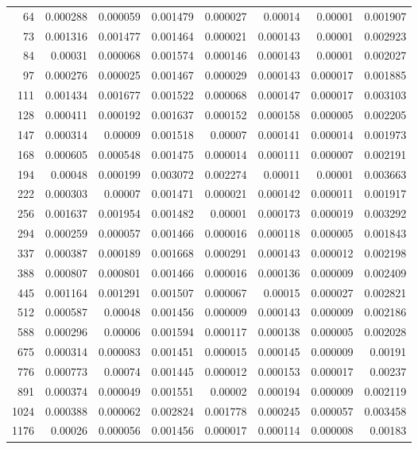 \begin{longtable}{r r r r r r r r}
64 & 0.000288 & 0.000059 & 0.001479 & 0.000027 & 0.00014 & 0.00001 & 0.001907 \\
73 & 0.001316 & 0.001477 & 0.001464 & 0.000021 & 0.000143 & 0.00001 & 0.002923 \\
84 & 0.00031 & 0.000068 & 0.001574 & 0.000146 & 0.000143 & 0.00001 & 0.002027 \\
97 & 0.000276 & 0.000025 & 0.001467 & 0.000029 & 0.000143 & 0.000017 & 0.001885 \\
111 & 0.001434 & 0.001677 & 0.001522 & 0.000068 & 0.000147 & 0.000017 & 0.003103 \\
128 & 0.000411 & 0.000192 & 0.001637 & 0.000152 & 0.000158 & 0.000005 & 0.002205 \\
147 & 0.000314 & 0.00009 & 0.001518 & 0.00007 & 0.000141 & 0.000014 & 0.001973 \\
168 & 0.000605 & 0.000548 & 0.001475 & 0.000014 & 0.000111 & 0.000007 & 0.002191 \\
194 & 0.00048 & 0.000199 & 0.003072 & 0.002274 & 0.00011 & 0.00001 & 0.003663 \\
222 & 0.000303 & 0.00007 & 0.001471 & 0.000021 & 0.000142 & 0.000011 & 0.001917 \\
256 & 0.001637 & 0.001954 & 0.001482 & 0.00001 & 0.000173 & 0.000019 & 0.003292 \\
294 & 0.000259 & 0.000057 & 0.001466 & 0.000016 & 0.000118 & 0.000005 & 0.001843 \\
337 & 0.000387 & 0.000189 & 0.001668 & 0.000291 & 0.000143 & 0.000012 & 0.002198 \\
388 & 0.000807 & 0.000801 & 0.001466 & 0.000016 & 0.000136 & 0.000009 & 0.002409 \\
445 & 0.001164 & 0.001291 & 0.001507 & 0.000067 & 0.00015 & 0.000027 & 0.002821 \\
512 & 0.000587 & 0.00048 & 0.001456 & 0.000009 & 0.000143 & 0.000009 & 0.002186 \\
588 & 0.000296 & 0.00006 & 0.001594 & 0.000117 & 0.000138 & 0.000005 & 0.002028 \\
675 & 0.000314 & 0.000083 & 0.001451 & 0.000015 & 0.000145 & 0.000009 & 0.00191 \\
776 & 0.000773 & 0.00074 & 0.001445 & 0.000012 & 0.000153 & 0.000017 & 0.00237 \\
891 & 0.000374 & 0.000049 & 0.001551 & 0.00002 & 0.000194 & 0.000009 & 0.002119 \\
1024 & 0.000388 & 0.000062 & 0.002824 & 0.001778 & 0.000245 & 0.000057 & 0.003458 \\
1176 & 0.00026 & 0.000056 & 0.001456 & 0.000017 & 0.000114 & 0.000008 & 0.00183 \\

\end{longtable}
